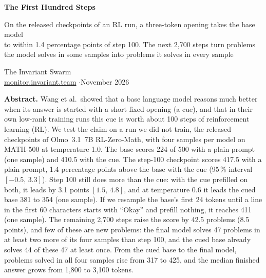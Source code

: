 \documentclass[10pt]{article}
\newcommand{\ci}[2]{$[#1,\,#2]$}
\begin{document}
\begin{center}
{\sffamily\bfseries\LARGE The First Hundred Steps\par}
\vspace{0.4em}
{\sffamily\large On the released checkpoints of an RL run, a three-token opening takes the base model\\ to within 1.4 percentage points of step 100. The next 2{,}700 steps turn problems the model solves in some samples into problems it solves in every sample\par}
\vspace{1.0em}
{\large The Invariant Swarm}\\[0.25em]
{\small \href{https://monitor.invariant.team}{monitor.invariant.team} \quad$\cdot$\quad November 2026}
\end{center}

\vspace{0.2em}
\begin{center}\begin{minipage}{0.88\textwidth}
\small
{\sffamily\bfseries Abstract.}
Wang et al.\ showed that a base language model reasons much better when its answer is started with a short fixed
opening (a cue), and that in their own low-rank training runs this cue is worth about 100 steps of reinforcement
learning (RL). We test the claim on a run we did not train, the released checkpoints of Olmo~3.1~7B RL-Zero-Math,
with four samples per model on MATH-500 at temperature 1.0. The base scores 224 of 500 with a plain prompt (one
sample) and 410.5 with the cue. The step-100 checkpoint scores 417.5 with a plain prompt, 1.4 percentage points
above the base with the cue (95\,\% interval \ci{-0.5}{3.3}). Step 100 still does more than the cue: with the cue
prefilled on both, it leads by 3.1 points \ci{1.5}{4.8}, and at temperature 0.6 it leads the cued base 381 to 354
(one sample). If we resample the base's first 24 tokens until a line in the first 60 characters starts with ``Okay'' and prefill nothing, it reaches
411 (one sample). The remaining 2{,}700 steps raise the score by 42.5 problems (8.5 points), and few of these are
new problems: the final model solves 47 problems in at least two more of its four samples than step 100, and the
cued base already solves 44 of these 47 at least once. From the cued base to the final model, problems solved in all
four samples rise from 317 to 425, and the median finished answer grows from 1{,}800 to 3{,}100 tokens.
\end{minipage}\end{center}
\vspace{0.1em}
\end{document}
